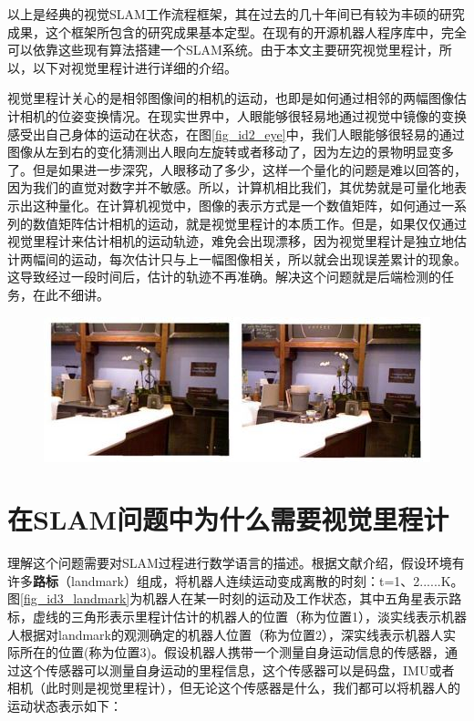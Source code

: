 \documentclass[10.5pt,twocolumn]{jbuaa}
\begin{document}
以上是经典的视觉SLAM工作流程框架，其在过去的几十年间已有较为丰硕的研究成果，这个框架所包含的研究成果基本定型。在现有的开源机器人程序库中，完全可以依靠这些现有算法搭建一个SLAM系统。由于本文主要研究视觉里程计，所以，以下对视觉里程计进行详细的介绍。

视觉里程计关心的是相邻图像间的相机的运动，也即是如何通过相邻的两幅图像估计相机的位姿变换情况。在现实世界中，人眼能够很轻易地通过视觉中镜像的变换感受出自己身体的运动在状态\cite{maer}，在图\ref{fig_id2_eye}中，我们人眼能够很轻易的通过图像从左到右的变化猜测出人眼向左旋转或者移动了，因为左边的景物明显变多了。但是如果进一步深究，人眼移动了多少，这样一个量化的问题是难以回答的，因为我们的直觉对数字并不敏感。所以，计算机相比我们，其优势就是可量化地表示出这种量化。在计算机视觉中，图像的表示方式是一个数值矩阵，如何通过一系列的数值矩阵估计相机的运动，就是视觉里程计的本质工作。但是，如果仅仅通过视觉里程计来估计相机的运动轨迹，难免会出现漂移，因为视觉里程计是独立地估计两幅间的运动，每次估计只与上一幅图像相关，所以就会出现误差累计的现象。这导致经过一段时间后，估计的轨迹不再准确。解决这个问题就是后端检测的任务，在此不细讲。

\begin{figure}[h!]
	\centering
	\includegraphics [scale=0.5,trim=0 0 0 0]{./image/eyes_image}
\end{figure}

\section{在SLAM问题中为什么需要视觉里程计}
\enlargethispage{-3.3cm}
理解这个问题需要对SLAM过程进行数学语言的描述。根据文献\cite{dummies}介绍，假设环境有许多\textbf{路标}（landmark）组成，将机器人连续运动变成离散的时刻：t=1、2......K。图\ref{fig_id3_landmark}为机器人在某一时刻的运动及工作状态，其中五角星表示路标，虚线的三角形表示里程计估计的机器人的位置（称为位置1），淡实线表示机器人根据对landmark的观测确定的机器人位置（称为位置2），深实线表示机器人实际所在的位置(称为位置3)。假设机器人携带一个测量自身运动信息的传感器，通过这个传感器可以测量自身运动的里程信息，这个传感器可以是码盘，IMU或者相机（此时则是视觉里程计），但无论这个传感器是什么，我们都可以将机器人的运动状态表示如下：
\end{document}
